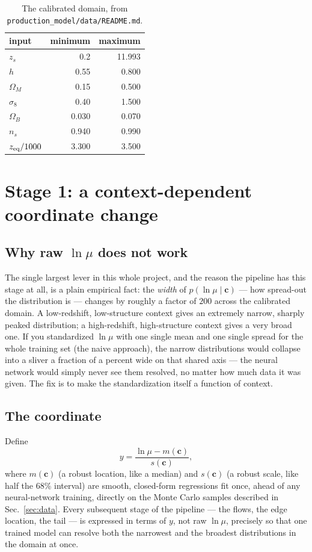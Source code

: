 \documentclass[11pt]{article}
\newcommand{\file}[1]{\texttt{#1}}
\newcommand{\vect}[1]{\boldsymbol{#1}}
\begin{document}
\begin{table}[h]
\centering
\begin{tabular}{lrr}
\toprule
input & minimum & maximum \\
\midrule
$z_s$ & 0.2 & 11.993 \\
$h$ & 0.55 & 0.800 \\
$\Omega_M$ & 0.15 & 0.500 \\
$\sigma_8$ & 0.40 & 1.500 \\
$\Omega_B$ & 0.030 & 0.070 \\
$n_s$ & 0.940 & 0.990 \\
$z_{\rm eq}/1000$ & 3.300 & 3.500 \\
\bottomrule
\end{tabular}
\caption{The calibrated domain, from \file{production\_model/data/README.md}.}
\label{tab:domain}
\end{table}

\section{Stage 1: a context-dependent coordinate change}
\label{sec:scale}

\subsection{Why raw $\ln\mu$ does not work}

The single largest lever in this whole project, and the reason the pipeline
has this stage at all, is a plain empirical fact: the \emph{width} of
$p(\ln\mu\mid \vect c)$ — how spread-out the distribution is — changes by
roughly a factor of $200$ across the calibrated domain. A low-redshift,
low-structure context gives an extremely narrow, sharply peaked
distribution; a high-redshift, high-structure context gives a very broad
one. If you standardized $\ln\mu$ with one single mean and one single
spread for the whole training set (the naive approach), the narrow
distributions would collapse into a sliver a fraction of a percent wide on
that shared axis — the neural network would simply never see them resolved,
no matter how much data it was given. The fix is to make the standardization
itself a function of context.

\subsection{The coordinate}

Define
\begin{equation}
 y = \frac{\ln\mu - m(\vect c)}{s(\vect c)},
 \label{eq:ystd}
\end{equation}
where $m(\vect c)$ (a robust location, like a median) and $s(\vect c)$ (a
robust scale, like half the 68\% interval) are smooth, closed-form
regressions fit once, ahead of any neural-network training, directly on the
Monte Carlo samples described in Sec.~\ref{sec:data}. Every subsequent stage
of the pipeline — the flows, the edge location, the tail — is expressed in
terms of $y$, not raw $\ln\mu$, precisely so that one trained model can
resolve both the narrowest and the broadest distributions in the domain at
once.
\end{document}
